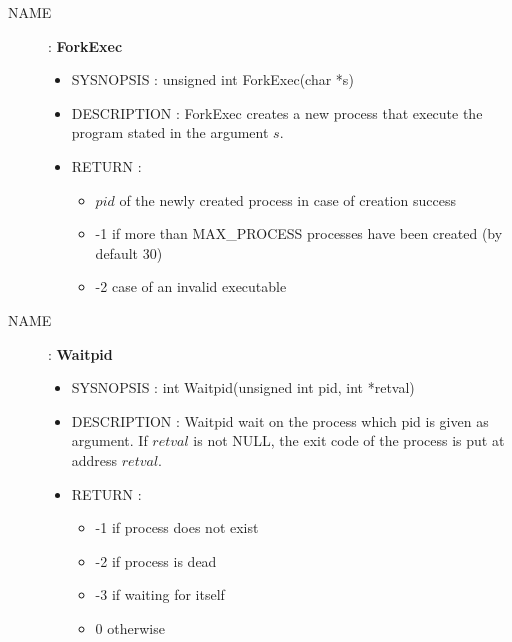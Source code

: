 \begin{description}
    \item [NAME] : \textbf{ForkExec}
        \begin{itemize}
            \item SYSNOPSIS : unsigned int ForkExec(char *s)
            \item DESCRIPTION :
                ForkExec creates a new process that execute the program stated in the argument $s$.
            \item RETURN :
                \begin{itemize}
                    \item $pid$ of the newly created process in case of creation success
                    \item -1 if more than MAX\_PROCESS processes have been created (by default 30)
                    \item -2 case of an invalid executable
                \end{itemize}
        \end{itemize}

    \item [NAME] : \textbf{Waitpid}
        \begin{itemize}
            \item SYSNOPSIS : int Waitpid(unsigned int pid, int *retval)
            \item DESCRIPTION :
                Waitpid wait on the process which pid is given as argument.
                If $retval$ is not NULL, the exit code of the process is put at address $retval$.
            \item RETURN :
                \begin{itemize}
                    \item -1 if process does not exist
                    \item -2 if process is dead
                    \item -3 if waiting for itself
                    \item 0 otherwise
                \end{itemize}
        \end{itemize}


\end{description}
